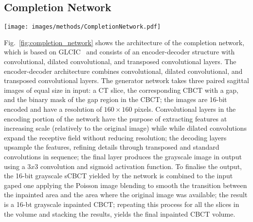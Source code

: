 \subsection{Completion Network}
\label{ssec:completion}
\begin{figure*}[tb]
	\centering
		\texttt{[image: images/methods/CompletionNetwork.pdf]}
	\caption{The architecture of the completion network.}
	\label{fig:completion_network}
\end{figure*}
Fig.~\ref{fig:completion_network} shows the architecture of the completion network, which is based on GLCIC~\cite{glcic} and consists of an encoder-decoder structure with convolutional, dilated convolutional, and transposed convolutional layers. 
The encoder-decoder architecture combines convolutional, dilated convolutional, and transposed convolutional layers.
The generator network takes three paired sagittal images of equal size in input: a CT slice, the corresponding CBCT with a gap, and the binary mask of the gap region in the CBCT; the images are 16-bit encoded and have a resolution of $160 \times 160$ pixels.
Convolutional layers in the encoding portion of the network have the purpose of extracting features at increasing scale (relatively to the original image) while while dilated convolutions expand the receptive field without reducing resolution; the decoding layers upsample the features, refining details through transposed and standard convolutions in sequence; the final layer produces the grayscale image in output using a $3x3$ convolution and sigmoid activation function. 
To finalise the output, the 16-bit grayscale sCBCT yielded by the network is combined to the input gaped one applying the Poisson image blending to smooth the transition between the inpainted area and the area where the original image was available; the result is a 16-bt grayscale inpainted CBCT; repeating this process for all the slices in the volume and stacking the results, yields the final inpainted CBCT volume. 

